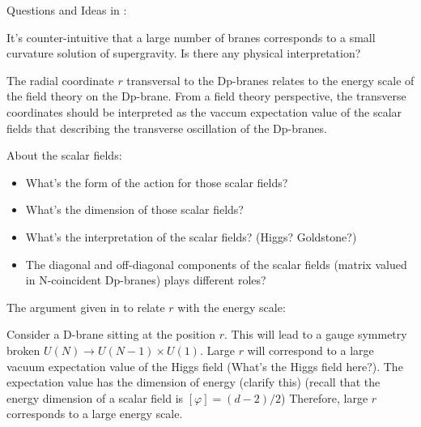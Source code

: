 
Questions and Ideas in :

\begin{question}
	It's counter-intuitive that a large number of branes 
	corresponds to a small curvature solution of supergravity.
	Is there any physical interpretation?
\end{question}

The radial coordinate $r$ transversal to the Dp-branes
relates to the energy scale of the field theory on the Dp-brane.
From a field theory perspective, the transverse coordinates
should be interpreted as the vaccum expectation value of the scalar fields
that describing the transverse oscillation of the Dp-branes.

\begin{question}
About the scalar fields:
\begin{itemize}
	\item What's the form of the action for those scalar fields?
	\item What's the dimension of those scalar fields?
	\item What's the interpretation of the scalar fields?
		(Higgs? Goldstone?)
	\item The diagonal and off-diagonal components of the scalar fields
		(matrix valued in N-coincident Dp-branes)
		plays different roles?
\end{itemize}
\end{question}

The argument given in  to relate $r$ with the energy scale:

\begin{info}
	Consider a D-brane sitting at the position $r$.
	This will lead to a gauge symmetry broken $U(N)\to U(N-1)\times U(1)$.
	Large $r$ will correspond to a large vacuum expectation value of the Higgs field (What's the Higgs field here?).
	The expectation value has the dimension of energy (clarify this)
	(recall that the energy dimension of a scalar field is $[\varphi]=(d-2)/2$)
	Therefore, large $r$ corresponds to a large energy scale.
\end{info}

